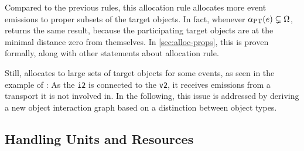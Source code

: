Compared to the previous rules, this allocation rule allocates more event emissions to proper subsets of the target objects. In fact, whenever $\alpha_\text{PT}(e)\subsetneq\Omega$,  returns the same result, because the participating target objects are at the minimal distance zero from themselves.
In \autoref{sec:alloc-props}, this is proven formally, along with other statements about allocation rule.

Still,  allocates to large sets of target objects for some events, as seen in the example of :
As the  \texttt{i2} is connected to the  \texttt{v2}, it receives emissions from a transport it is not involved in.
In the following, this issue is addressed by deriving a new object interaction graph based on a distinction between object types.

\subsection{Handling Units and Resources}
\label{sec:alloc-otcs}

